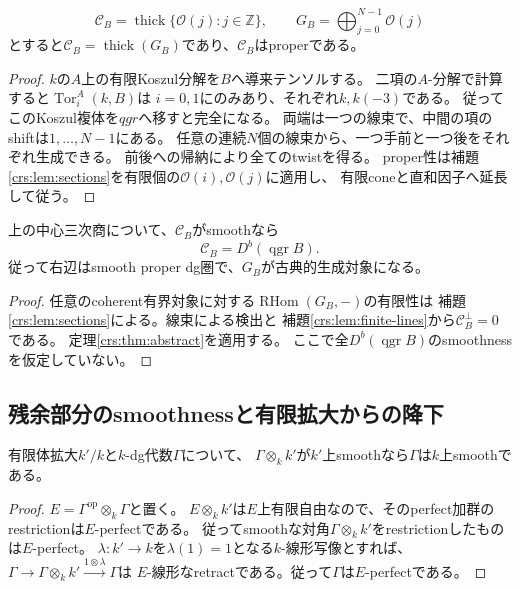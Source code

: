 \begin{lemma}[有限線束生成対象]
\label{crs:lem:finite-lines}
\[
 \mathcal C_B=\operatorname{thick}\{\mathcal O(j):j\in\mathbb Z\},
 \qquad G_B=\bigoplus_{j=0}^{N-1}\mathcal O(j)
\]
とすると$\mathcal C_B=\operatorname{thick}(G_B)$であり、$\mathcal C_B$はproperである。
\end{lemma}
\begin{proof}
$k$の$A$上の有限Koszul分解を$B$へ導来テンソルする。
二項の$A$-分解で計算すると$\operatorname{Tor}^A_i(k,B)$は
$i=0,1$にのみあり、それぞれ$k,k(-3)$である。
従ってこのKoszul複体を$qgr$へ移すと完全になる。
両端は一つの線束で、中間の項のshiftは$1,\ldots,N-1$にある。
任意の連続$N$個の線束から、一つ手前と一つ後をそれぞれ生成できる。
前後への帰納により全てのtwistを得る。
proper性は補題\ref{crs:lem:sections}を有限個の$\mathcal O(i),\mathcal O(j)$に適用し、
有限coneと直和因子へ延長して従う。
\end{proof}

\begin{theorem}[線束部分のsmoothnessで全coherent圏を得る]
\label{crs:thm:coherent}
上の中心三次商について、$\mathcal C_B$がsmoothなら
\[
 \boxed{\quad
 \mathcal C_B=D^b(\operatorname{qgr}B).
 \quad}\tag{CS3}\label{crs:eq:full}
\]
従って右辺はsmooth proper dg圏で、$G_B$が古典的生成対象になる。
\end{theorem}
\begin{proof}
任意のcoherent有界対象に対する$\operatorname{RHom}(G_B,-)$の有限性は
補題\ref{crs:lem:sections}による。線束による検出と
補題\ref{crs:lem:finite-lines}から$\mathcal C_B^\perp=0$である。
定理\ref{crs:thm:abstract}を適用する。
ここで全$D^b(\operatorname{qgr}B)$のsmoothnessを仮定していない。
\end{proof}

\subsection{残余部分のsmoothnessと有限拡大からの降下}

\begin{lemma}[有限体拡張からのsmoothness降下]
\label{crs:lem:descent}
有限体拡大$k'/k$と$k$-dg代数$\Gamma$について、
$\Gamma\otimes_k k'$が$k'$上smoothなら$\Gamma$は$k$上smoothである。
\end{lemma}
\begin{proof}
$E=\Gamma^{\mathrm{op}}\otimes_k\Gamma$と置く。
$E\otimes_k k'$は$E$上有限自由なので、そのperfect加群のrestrictionは$E$-perfectである。
従ってsmoothな対角$\Gamma\otimes_k k'$をrestrictionしたものは$E$-perfect。
$\lambda:k'\to k$を$\lambda(1)=1$となる$k$-線形写像とすれば、
$\Gamma\to\Gamma\otimes_k k'\xrightarrow{1\otimes\lambda}\Gamma$は
$E$-線形なretractである。従って$\Gamma$は$E$-perfectである。
\end{proof}

